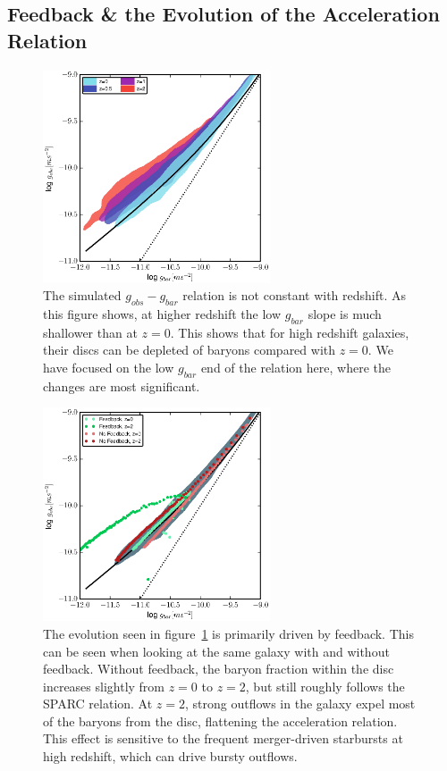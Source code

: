 \subsection{Feedback \& the Evolution of the Acceleration Relation}
\begin{figure}
    \includegraphics[width=0.6\textwidth]{figures4/redshift_evolution.eps}
    \caption[Redshift evolution of acceleration relation]{The  simulated
    $g_{obs}-g_{bar}$ relation is not constant with redshift.  As this figure
    shows, at higher redshift the low $g_{bar}$ slope is much shallower than at
    $z=0$.  This shows that for high redshift galaxies, their discs can be
    depleted of baryons compared with $z=0$.  We have focused on the low
    $g_{bar}$ end of the relation here, where the changes are most significant.}
    \label{redshift_evolution}
\end{figure}
\begin{figure}
    \includegraphics[width=0.6\textwidth]{figures4/FB_effects.eps}
    \caption[Feedback effects on acceleration relation]{The evolution seen in
    figure~\ref{redshift_evolution} is primarily driven by feedback.  This can
    be seen when looking at the same galaxy with and without feedback.  Without
    feedback, the baryon fraction within the disc increases slightly from $z=0$
    to $z=2$, but still roughly follows the SPARC relation.  At $z=2$, strong
    outflows in the galaxy expel most of the baryons from the disc, flattening
    the acceleration relation.  This effect is sensitive to the frequent
    merger-driven starbursts at high redshift, which can drive bursty outflows.}
    \label{FB_effects}
\end{figure}
